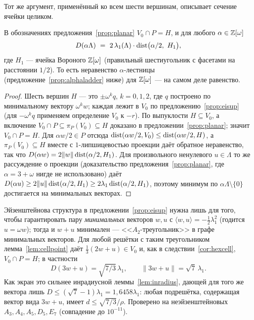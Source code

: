 Тот же аргумент, применённый ко всем шести вершинам, описывает сечение ячейки
целиком.

\begin{corollary}\label{cor:hexcell}
В обозначениях предложения~\ref{prop:planar}
$V_0\cap P=H$, и для любого $\alpha\in\mathbb{Z}[\omega]$
\[
D(\alpha\Lambda)\ =\ 2\,\lambda_1(\Lambda)\cdot\dist\bigl(\alpha/2,\ H_1\bigr),
\]
где $H_1$ --- ячейка Вороного $\mathbb{Z}[\omega]$ (правильный шестиугольник с фасетами
на расстоянии $1/2$). То есть неравенство $\alpha$-лестницы
(предложение~\ref{prop:alphaladder} ниже) для $\mathbb{Z}[\omega]$ --- на самом деле
равенство.
\end{corollary}

\begin{proof}
Шесть вершин $H$ --- это $\pm\omega^kq$, $k=0,1,2$, где $q$ построено
по минимальному вектору $\omega^kw$; каждая лежит в $V_0$ по
предложению~\ref{prop:eisup} (для $-\omega^kq$ применяем определение $V_0$
к $-r$). По выпуклости $H\subseteq V_0$, а включение $V_0\cap P\subseteq
\pi_P(V_0)\subseteq H$ доказано в предложении~\ref{prop:planar}; значит
$V_0\cap P=H$. Для $\alpha w/2\in P$ отсюда
$\operatorname{dist}(\alpha w/2,V_0)\le\operatorname{dist}(\alpha w/2,H)$, а $\pi_P(V_0)\subseteq H$ вместе
с $1$-липшицевостью проекции даёт обратное неравенство, так что
$D(\alpha w)=2\|w\|\operatorname{dist}(\alpha/2,H_1)$. Для произвольного ненулевого
$u\in\Lambda$ то же рассуждение о проекции (доказательство
предложения~\ref{prop:planar}, где $\alpha=3+\omega$ нигде не использовано)
даёт $D(\alpha u)\ge2\|u\|\operatorname{dist}(\alpha/2,H_1)\ge2\lambda_1\operatorname{dist}(\alpha/2,H_1)$,
поэтому минимум по $\alpha\Lambda\setminus\{0\}$ достигается на минимальных
векторах.
\end{proof}

\begin{remark}\label{rem:a2tri}
Эйзенштейнова структура в предложении~\ref{prop:eisup} нужна лишь для того,
чтобы гарантировать пару \emph{минимальных} векторов $w,u$ с
$\langle w,u\rangle=-\frac12\lambda_1^2$ (годится $u=\omega w$); тогда и
$w+u$ минимален --- <<$A_2$-треугольник>> в графе минимальных векторов. Для
любой решётки с таким треугольником лемма~\ref{lem:cellpoint} даёт
$\frac13(2w+u)\in V_0$ и, как в следствии~\ref{cor:hexcell},
$V_0\cap P=H$; в частности
\[
D(3w+u)=\sqrt{7/3}\,\lambda_1,\qquad\|3w+u\|=\sqrt7\,\lambda_1 .
\]
Как экран это сильнее инрадиусной леммы~\ref{lem:inradius}, дающей для того же
вектора лишь $D\le(\sqrt7-1)\lambda_1=1{,}6458\lambda_1$: любая подрешётка,
содержащая вектор вида $3w+u$, имеет $d\le\sqrt{7/3}/\rho$. Проверено на
неэйзенштейновых $A_3,A_4,A_5,D_5,E_7$ (совпадение до $10^{-11}$).
\end{remark}

